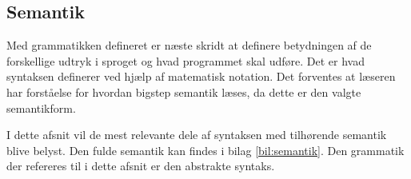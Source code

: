 \subsection{Semantik}\label{sec:Syntax}
Med grammatikken defineret er næste skridt at definere betydningen af de forskellige udtryk i sproget og hvad programmet skal udføre. Det er hvad syntaksen definerer ved hjælp af matematisk notation. Det forventes at læseren har forståelse for hvordan bigstep semantik læses, da dette er den valgte semantikform. 

I dette afsnit vil de mest relevante dele af syntaksen med tilhørende semantik blive belyst. Den fulde semantik kan findes i bilag \ref{bil:semantik}. Den grammatik der refereres til i dette afsnit er den abstrakte syntaks.



%

